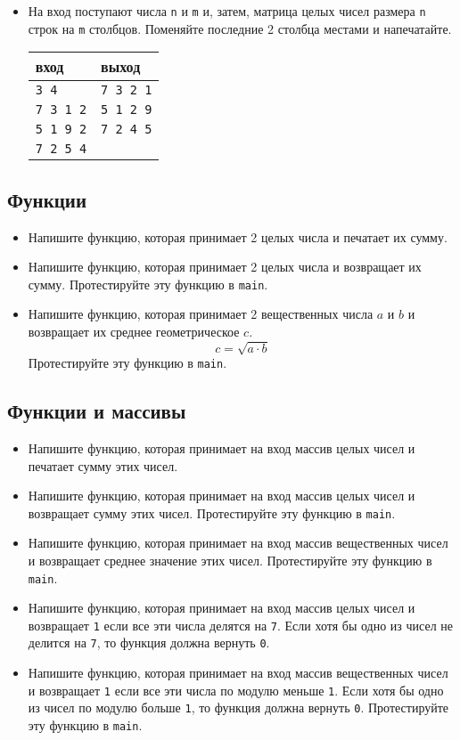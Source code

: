 \documentclass{article}
\begin{document}
\begin{itemize}
\item На вход поступают числа \texttt{n} и \texttt{m} и, затем, матрица целых чисел размера \texttt{n} строк на \texttt{m} столбцов. Поменяйте последние 2 столбца местами и напечатайте.
\begin{center}
\begin{tabular}{ l | l }
 вход & выход \\ \hline
 \texttt{3 4} &        \texttt{7 3 2 1}  \\ 
 \texttt{7 3 1 2} &    \texttt{5 1 2 9}\\ 
 \texttt{5 1 9 2} &    \texttt{7 2 4 5}\\ 
 \texttt{7 2 5 4} &  \\ 
\end{tabular}
\end{center}
\end{itemize}


\subsection*{Функции}
\begin{itemize}
\item Напишите функцию, которая принимает 2 целых числа и печатает их сумму.
\item Напишите функцию, которая принимает 2 целых числа и возвращает их сумму. Протестируйте эту функцию в \texttt{main}.

\item Напишите функцию, которая принимает 2 вещественных числа $a$ и  $b$ и возвращает их среднее геометрическое $c$.
$$
c = \sqrt{a \cdot b}
$$
Протестируйте эту функцию в \texttt{main}.
\end{itemize}

\subsection*{Функции и массивы}
\begin{itemize}
\item Напишите функцию, которая принимает на вход массив целых чисел и печатает сумму этих чисел.
\item Напишите функцию, которая принимает на вход массив целых чисел и возвращает сумму этих чисел. Протестируйте эту функцию в \texttt{main}.
\item Напишите функцию, которая принимает на вход массив вещественных чисел и возвращает среднее значение этих чисел. Протестируйте эту функцию в \texttt{main}.
\item Напишите функцию, которая принимает на вход массив целых чисел и возвращает \texttt{1} если все эти числа делятся на \texttt{7}. Если хотя бы одно из чисел не делится на \texttt{7}, то функция должна вернуть \texttt{0}.
\item Напишите функцию, которая принимает на вход массив вещественных чисел и возвращает \texttt{1} если все эти числа по модулю меньше \texttt{1}. Если хотя бы одно из чисел по модулю больше \texttt{1}, то функция должна вернуть \texttt{0}. Протестируйте эту функцию в \texttt{main}.
\end{itemize}
\end{document}

